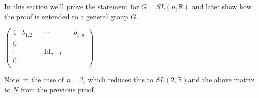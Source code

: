 \documentclass[
  12pt
]{article}
\theoremstyle{break}
\theoremstyle{plain}
\newcommand{\G}{\ensuremath{G}}
\newcommand{\sltr}{\ensuremath{SL(2, \mathbb{R})}}
\newcommand{\slnr}{\ensuremath{SL(n, \mathbb{R})}}
\begin{document}
  In this section we'll prove the statement for $G = \slnr$ and later show how the proof is extended to a general group \G.


  \begin{math}
    \begin{pmatrix}
      1 & b_{1,2} & & \cdots & & b_{1,n} \\
      0 & & &  & \\
      \vdots & & & \text{Id}_{n-1} & \\
      0 & & & & \\
    \end{pmatrix}
  \end{math}

  Note: in the case of $n = 2$, which reduces this to \sltr and the above matrix to $N$ from the previous proof.
\end{document}
